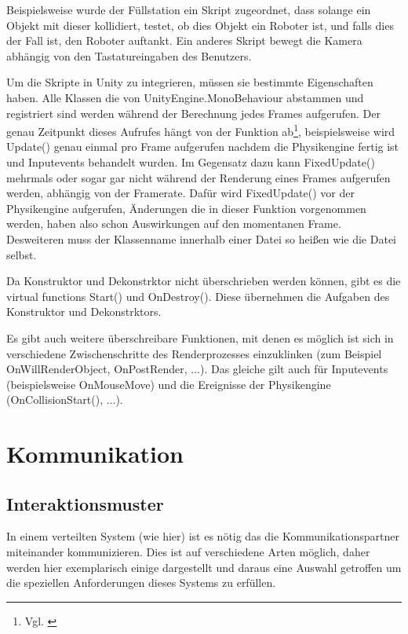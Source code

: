 Beispielsweise wurde der F{\"{u}}llstation ein Skript zugeordnet, dass solange ein Objekt mit dieser kollidiert, testet, ob dies Objekt ein Roboter ist, und falls dies der Fall ist,
den Roboter auftankt. Ein anderes Skript bewegt die Kamera abh{\"{a}}ngig von den Tastatureingaben des Benutzers.

Um die Skripte in Unity zu integrieren, m{\"{u}}ssen sie bestimmte Eigenschaften haben. Alle Klassen die von UnityEngine.MonoBehaviour
abstammen und registriert sind werden w{\"{a}}hrend der Berechnung jedes Frames aufgerufen. Der genau Zeitpunkt dieses Aufrufes h{\"{a}}ngt von
der Funktion ab\footnote{Vgl. \cite{unity-exec-order}}, beispielsweise wird Update() genau einmal pro Frame aufgerufen nachdem die Physikengine fertig ist
und Inputevents behandelt wurden. Im Gegensatz dazu kann FixedUpdate() mehrmals oder sogar gar nicht w{\"{a}}hrend der Renderung eines Frames aufgerufen
werden, abh{\"{a}}ngig von der Framerate. Daf{\"{u}}r wird FixedUpdate() vor der Physikengine aufgerufen, {\"{A}}nderungen die in dieser
Funktion vorgenommen werden, haben also schon Auswirkungen auf den momentanen Frame. Desweiteren muss der Klassenname innerhalb einer Datei so
hei{\ss}en wie die Datei selbst.

Da Konstruktor und Dekonstrktor nicht {\"{u}}berschrieben werden k{\"{o}}nnen, gibt es die virtual functions Start() und OnDestroy(). Diese
{\"{u}}bernehmen die Aufgaben des Konstruktor und Dekonstrktors.

Es gibt auch weitere {\"{u}}berschreibare Funktionen, mit denen es m{\"{o}}glich ist sich in verschiedene Zwischenschritte des Renderprozesses
einzuklinken (zum Beispiel OnWillRenderObject, OnPostRender, ...). Das gleiche gilt auch f{\"{u}}r Inputevents (beispielsweise OnMouseMove) und
die Ereignisse der Physikengine (OnCollisionStart(), ...).

\clearpage
\section{Kommunikation}

\subsection{Interaktionsmuster}
In einem verteilten System (wie hier) ist es n{\"{o}}tig das die Kommunikationspartner miteinander kommunizieren.
Dies ist auf verschiedene Arten m{\"{o}}glich, daher werden hier exemplarisch einige dargestellt und daraus eine
Auswahl getroffen um die speziellen Anforderungen dieses Systems zu erf{\"{u}}llen.

